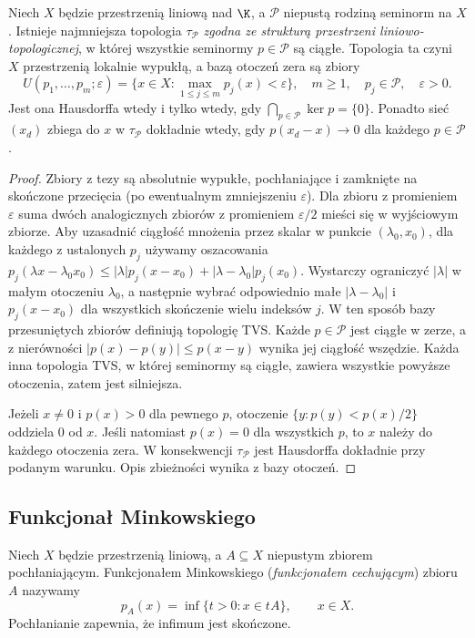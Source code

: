 \begin{twierdzenie}
\label{thm:seminorm-topology}
Niech $X$ będzie przestrzenią liniową nad $\K$, a
$\mathcal P$ niepustą rodziną seminorm na $X$. Istnieje
najmniejsza topologia $\tau_{\mathcal P}$ \emph{zgodna ze
strukturą przestrzeni liniowo-topologicznej}, w której
wszystkie seminormy $p\in\mathcal P$ są ciągłe.
Topologia ta czyni $X$ przestrzenią lokalnie wypukłą,
a bazą otoczeń zera są zbiory
\[
 U(p_1,\ldots,p_m;\varepsilon)
 =\{x\in X:\max_{1\le j\le m}p_j(x)<\varepsilon\},
 \quad m\ge1,\quad p_j\in\mathcal P,\quad\varepsilon>0.
\]
Jest ona Hausdorffa wtedy i tylko wtedy, gdy
$\bigcap_{p\in\mathcal P}\ker p=\{0\}$.
Ponadto sieć $(x_d)$ zbiega do $x$ w $\tau_{\mathcal P}$
dokładnie wtedy, gdy $p(x_d-x)\to0$ dla każdego $p\in\mathcal P$.
\end{twierdzenie}
\begin{proof}
Zbiory z tezy są absolutnie wypukłe, pochłaniające i
zamknięte na skończone przecięcia (po ewentualnym
zmniejszeniu $\varepsilon$). Dla zbioru z promieniem
$\varepsilon$ suma dwóch analogicznych zbiorów z promieniem
$\varepsilon/2$ mieści się w wyjściowym zbiorze.
Aby uzasadnić ciągłość mnożenia przez skalar w punkcie
$(\lambda_0,x_0)$, dla każdego z ustalonych $p_j$
używamy oszacowania
$p_j(\lambda x-\lambda_0x_0)\le
|\lambda|p_j(x-x_0)+|\lambda-\lambda_0|p_j(x_0)$.
Wystarczy ograniczyć $|\lambda|$ w małym otoczeniu
$\lambda_0$, a następnie wybrać odpowiednio małe
$|\lambda-\lambda_0|$ i $p_j(x-x_0)$ dla wszystkich
skończenie wielu indeksów $j$.
W ten sposób bazy przesuniętych zbiorów definiują
topologię TVS.
Każde $p\in\mathcal P$ jest ciągłe w zerze, a z nierówności
$|p(x)-p(y)|\le p(x-y)$ wynika jej ciągłość wszędzie.
Każda inna topologia TVS, w której seminormy są ciągłe,
zawiera wszystkie powyższe otoczenia, zatem jest silniejsza.

Jeżeli $x\ne0$ i $p(x)>0$ dla pewnego $p$, otoczenie
$\{y:p(y)<p(x)/2\}$ oddziela $0$ od $x$.
Jeśli natomiast $p(x)=0$ dla wszystkich $p$, to $x$
należy do każdego otoczenia zera. W konsekwencji
$\tau_{\mathcal P}$ jest Hausdorffa dokładnie przy
podanym warunku. Opis zbieżności wynika z bazy otoczeń.
\end{proof}

\subsection{Funkcjonał Minkowskiego}

\begin{definicja}
\label{def:gauge}
Niech $X$ będzie przestrzenią liniową, a $A\subseteq X$
niepustym zbiorem pochłaniającym. Funkcjonałem Minkowskiego
(\emph{funkcjonałem cechującym}) zbioru $A$ nazywamy
\[
 p_A(x)=\inf\{t>0:x\in tA\},\qquad x\in X.
\]
Pochłanianie zapewnia, że infimum jest skończone.
\end{definicja}

